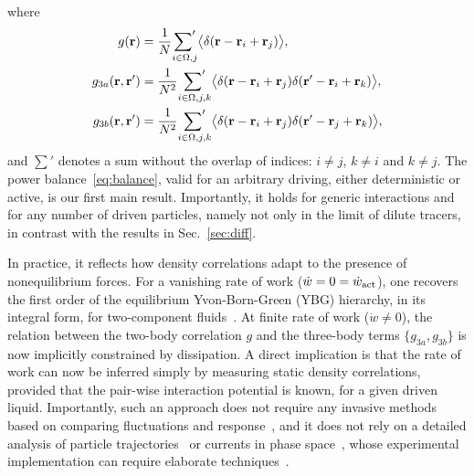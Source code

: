 \documentclass[superscriptaddress, twocolumn, prx, longbibliography, nofootinbib]{revtex4-1}
\begin{document}
where
\begin{equation}
	\begin{aligned}
 		g({\bf r}) &= \frac{1}{N} \underset{i\in\Omega,j}{{\sum}'} \big\langle \delta({\bf r}-{\bf r}_i+{\bf r}_j)\big\rangle ,
		\\
 		g_{3a}({\bf r},{\bf r}') &= \frac{1}{N^2} \underset{i\in\Omega,j,k}{{\sum}'} \big\langle \delta({\bf r}-{\bf r}_i+{\bf r}_j) \delta({\bf r}'-{\bf r}_i+{\bf r}_k)\big\rangle ,
		\\
 		g_{3b}({\bf r},{\bf r}') &= \frac{1}{N^2} \underset{i\in\Omega,j,k}{{\sum}'} \big\langle \delta({\bf r}-{\bf r}_i+{\bf r}_j) \delta({\bf r}'-{\bf r}_j+{\bf r}_k)\big\rangle ,
	\end{aligned}
\end{equation}
and $\sum'$ denotes a sum without the overlap of indices: $i\neq j$, $k\neq i$ and $k\neq j$. The power balance~\eqref{eq:balance}, valid for an arbitrary driving, either deterministic or active, is our first main result. Importantly, it holds for generic interactions and for any number of driven particles, namely not only in the limit of dilute tracers, in contrast with the results in Sec.~\ref{sec:diff}.


In practice, it reflects how density correlations adapt to the presence of nonequilibrium forces. For a vanishing rate of work ($\dot w = 0 = \dot w_{\rm act}$), one recovers the first order of the equilibrium Yvon-Born-Green (YBG) hierarchy, in its integral form, for two-component fluids~\cite{Hansen2013}. At finite rate of work ($\dot w\neq0$), the relation between the two-body correlation $g$ and the three-body terms $\{g_{3a},g_{3b}\}$ is now implicitly constrained by dissipation. A direct implication is that the rate of work can now be inferred simply by measuring static density correlations, provided that the pair-wise interaction potential is known, for a given driven liquid. Importantly, such an approach does not require any invasive methods based on comparing fluctuations and response~\cite{Harada2005, Mizuno2007, Visco2015, Turlier2016, Ahmed2018}, and it does not rely on a detailed analysis of particle trajectories~\cite{Roldan2018, Parrondo2018} or currents in phase space~\cite{Gingrich2017, Li2018}, whose experimental implementation can require elaborate techniques~\cite{Battle604, Mura2018}.
\end{document}
